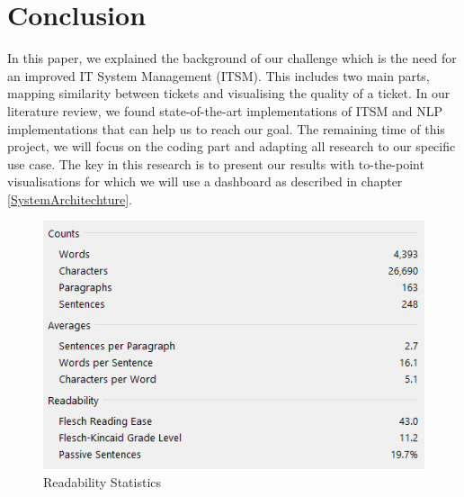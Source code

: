 \documentclass[a4paper,12pt]{report}
\begin{document}
    
    \chapter{Conclusion}
    In this paper, we explained the background of our challenge which is the need for an improved IT System Management (ITSM). This includes two main parts, mapping similarity between tickets and visualising the quality of a ticket. In our literature review, we found state-of-the-art implementations of ITSM and NLP implementations that can help us to reach our goal. The remaining time of this project, we will focus on the coding part and adapting all research to our specific use case. The key in this research is to present our results with to-the-point visualisations for which we will use a dashboard as described in chapter \vref{SystemArchitechture}.

    
    \nocite{*}

    
    

    
    \listoffigures
    
    \newpage
    \begin{figure}[!h]
        \includegraphics[width=\linewidth]{readability.png}
        \centering
        \caption{Readability Statistics}
    \end{figure}
\end{document}
